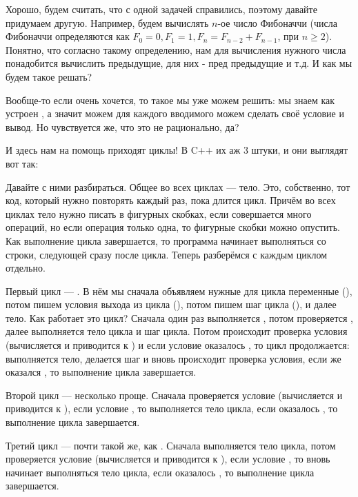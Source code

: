 
Хорошо, будем считать, что с одной задачей справились, поэтому давайте придумаем другую. Например, будем вычислять $n$-ое число Фибоначчи (числа Фибоначчи определяются как $F_0 = 0, F_1 = 1, F_n = F_{n - 2} + F_{n - 1}$, при $n \ge 2$). Понятно, что согласно такому определению, нам для вычисления нужного числа понадобится вычислить предыдущие, для них - пред предыдущие и т.д. И как мы будем такое решать?

Вообще-то если очень хочется, то такое мы уже можем решить: мы знаем как устроен , а значит можем для каждого вводимого  можем сделать своё условие и вывод. Но чувствуется же, что это не рационально, да?

И здесь нам на помощь приходят циклы! В C++ их аж 3 штуки, и они выглядят вот так:


Давайте с ними разбираться. Общее во всех циклах — тело. Это, собственно, тот код, который нужно повторять каждый раз, пока длится цикл. Причём во всех циклах тело нужно писать в фигурных скобках, если совершается много операций, но если операция только одна, то фигурные скобки можно опустить. Как выполнение цикла завершается, то программа начинает выполняться со строки, следующей сразу после цикла. Теперь разберёмся с каждым циклом отдельно.

Первый цикл — . В нём мы сначала объявляем нужные для цикла переменные (), потом пишем условия выхода из цикла (), потом пишем шаг цикла (), и далее тело. Как работает это цикл? Сначала один раз выполняется , потом проверяется , далее выполняется тело цикла и шаг цикла. Потом происходит проверка условия (вычисляется  и приводится к ) и если условие оказалось , то цикл продолжается: выполняется тело, делается шаг и вновь происходит проверка условия, если же  оказался , то выполнение цикла завершается.

Второй цикл —  несколько проще. Сначала проверяется условие (вычисляется  и приводится к ), если условие , то выполняется тело цикла, если оказалось , то выполнение цикла завершается.

Третий цикл —  почти такой же, как . Сначала выполняется тело цикла, потом проверяется условие (вычисляется  и приводится к ), если условие , то вновь начинает выполняться тело цикла, если оказалось , то выполнение цикла завершается.

